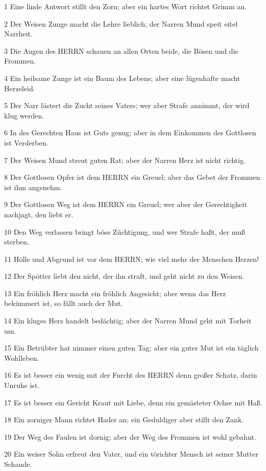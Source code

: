 \par 1 Eine linde Antwort stillt den Zorn; aber ein hartes Wort richtet Grimm an.
\par 2 Der Weisen Zunge macht die Lehre lieblich; der Narren Mund speit eitel Narrheit.
\par 3 Die Augen des HERRN schauen an allen Orten beide, die Bösen und die Frommen.
\par 4 Ein heilsame Zunge ist ein Baum des Lebens; aber eine lügenhafte macht Herzeleid.
\par 5 Der Narr lästert die Zucht seines Vaters; wer aber Strafe annimmt, der wird klug werden.
\par 6 In des Gerechten Haus ist Guts genug; aber in dem Einkommen des Gottlosen ist Verderben.
\par 7 Der Weisen Mund streut guten Rat; aber der Narren Herz ist nicht richtig.
\par 8 Der Gottlosen Opfer ist dem HERRN ein Greuel; aber das Gebet der Frommen ist ihm angenehm.
\par 9 Der Gottlosen Weg ist dem HERRN ein Greuel; wer aber der Gerechtigkeit nachjagt, den liebt er.
\par 10 Den Weg verlassen bringt böse Züchtigung, und wer Strafe haßt, der muß sterben.
\par 11 Hölle und Abgrund ist vor dem HERRN; wie viel mehr der Menschen Herzen!
\par 12 Der Spötter liebt den nicht, der ihn straft, und geht nicht zu den Weisen.
\par 13 Ein fröhlich Herz macht ein fröhlich Angesicht; aber wenn das Herz bekümmert ist, so fällt auch der Mut.
\par 14 Ein kluges Herz handelt bedächtig; aber der Narren Mund geht mit Torheit um.
\par 15 Ein Betrübter hat nimmer einen guten Tag; aber ein guter Mut ist ein täglich Wohlleben.
\par 16 Es ist besser ein wenig mit der Furcht des HERRN denn großer Schatz, darin Unruhe ist.
\par 17 Es ist besser ein Gericht Kraut mit Liebe, denn ein gemästeter Ochse mit Haß.
\par 18 Ein zorniger Mann richtet Hader an; ein Geduldiger aber stillt den Zank.
\par 19 Der Weg des Faulen ist dornig; aber der Weg des Frommen ist wohl gebahnt.
\par 20 Ein weiser Sohn erfreut den Vater, und ein törichter Mensch ist seiner Mutter Schande.
